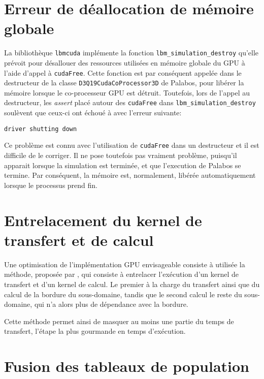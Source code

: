 \section{Erreur de déallocation de mémoire globale}

La bibliothèque \texttt{lbmcuda} implémente la fonction \texttt{lbm\_simulation\_destroy} qu'elle prévoit pour désallouer des ressources utilisées en mémoire globale du \acs{GPU} à l'aide d'appel à \texttt{cudaFree}. Cette fonction est par conséquent appelée dans le destructeur de la classe \texttt{D3Q19CudaCoProcessor3D} de Palabos, pour libérer la mémoire lorsque le co-processeur \acs{GPU} est détruit. Toutefois, lors de l'appel au destructeur, les \textit{assert} placé autour des \texttt{cudaFree} dans \texttt{lbm\_simulation\_destroy} soulèvent que ceux-ci ont échoué à avec l'erreur suivante:

\begin{center}
\texttt{driver shutting down}
\end{center}

\noindent Ce problème est connu avec l'utilisation de \texttt{cudaFree} dans un destructeur \cite{ZZZweb_stack_2018, ZZZweb_stack_2018-1} et il est difficile de le corriger. Il ne pose toutefois pas vraiment problème, puisqu'il apparait lorsque la simulation est terminée, et que l'execution de Palabos se termine. Par conséquent, la mémoire est, normalement, libérée automatiquement lorsque le processus prend fin.

\section{Entrelacement du kernel de transfert et de calcul}
Une optimisation de l'implémentation \acs{GPU} envisageable consiste à utilisée la méthode, proposée par \citet{feichtinger_performance_2015}, qui consiste à entrelacer l'exécution d'un kernel de transfert et d'un kernel de calcul. Le premier à la charge du transfert ainsi que du calcul de la bordure du sous-domaine, tandis que le second calcul le reste du sous-domaine, qui n'a alors plus de dépendance avec la bordure.

Cette méthode permet ainsi de masquer au moins une partie du temps de transfert, l'étape la plus gourmande en temps d'exécution. 

\section{Fusion des tableaux de population}

